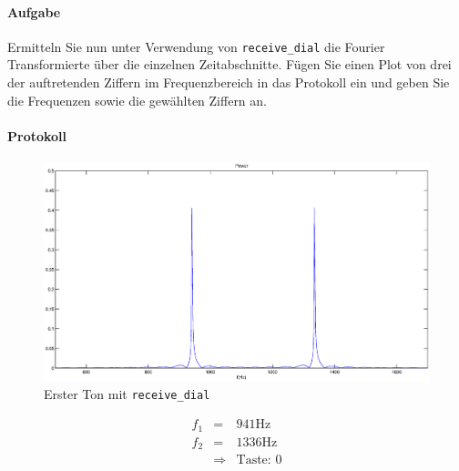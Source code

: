 \documentclass[10pt]{report}
\begin{document}
        \paragraph{Aufgabe}
        Ermitteln Sie nun unter Verwendung von \texttt{receive\_dial} die Fourier Transformierte
        über die einzelnen Zeitabschnitte. Fügen Sie einen Plot von drei der auftretenden
        Ziffern im Frequenzbereich in das Protokoll ein und geben Sie die Frequenzen sowie
        die gewählten Ziffern an.

        \paragraph{Protokoll}
        \begin{center}
            \begin{figure}[H]
                \includegraphics[width=\textwidth]{img43541}
                \caption{Erster Ton mit \texttt{receive\_dial}}
            \end{figure}
        \end{center}
        \begin{eqnarray*}
            f_1 &=& 941 \si{\hertz}\\
            f_2 &=& 1336 \si{\hertz}\\
            &\Rightarrow& \text{Taste: }0
        \end{eqnarray*}
\end{document}
